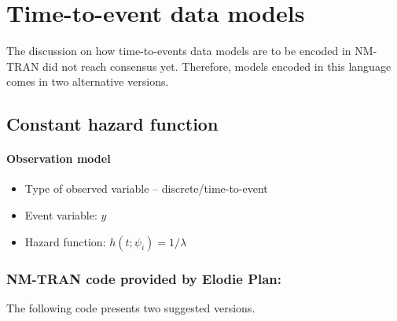 \section{Time-to-event data models}
\label{subsec:timeToEventData}
The discussion on how time-to-events data models are to be encoded in NM-TRAN
did not reach consensus yet. Therefore, models encoded in this language comes in two alternative versions.

\subsection{Constant hazard function}

\paragraph{Observation model}

\begin{itemize}
\item
Type of observed variable -- discrete/time-to-event
\item
Event variable: $y$
\item
Hazard function: $h(t; \psi_i) = 1/\lambda$
\end{itemize}


\subsubsection{NM-TRAN code provided by Elodie Plan:}
The following code presents two suggested versions.

\myStartLine

